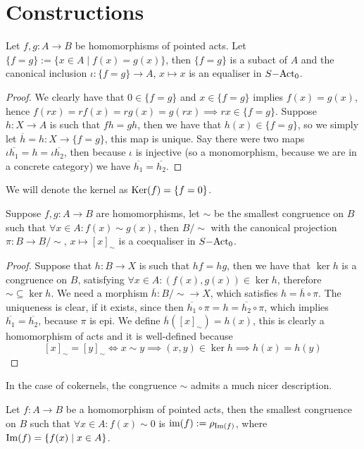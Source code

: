 \section{Constructions}
\begin{proposition}
    Let $f,g: A \to B$ be homomorphisms of pointed acts. Let $\{f=g\} := \{x\in A \mid f(x) = g(x)\}$, then $\{f=g\}$ is a subact of $A$ and 
    the canonical inclusion $\iota: \{f=g\} \to A$, $x\mapsto x$ is an equaliser in $S\mathrm{-Act}_0$.
\end{proposition}
\begin{proof}
    We clearly have that $0\in\{f=g\}$ and $x\in\{f=g\}$ implies $f(x)=g(x)$, hence $f(rx)=rf(x)=rg(x)=g(rx) \implies rx\in\{f=g\}$. 
    Suppose $h: X \to A$ is such that $fh=gh$, then we have that $h(x)\in\{f=g\}$, so we simply let $\overline{h} = h: X\to\{f=g\}$, this
    map is unique. Say there were two maps $\iota\overline{h_1}=h=\iota\overline{h_2}$, then because $\iota$ is injective (so a monomorphism, 
    because we are in a concrete category) we have $\overline{h_1}=\overline{h_2}$.
\end{proof}
    We will denote the kernel as $\mathrm{Ker}(f) = \{f=0\}$. 
\begin{proposition}
    Suppose $f,g: A\to B$ are homomorphisms, let $\sim$ be the smallest congruence on $B$ such that $\forall x\in A: f(x)\sim g(x)$, then 
    $B/\sim$ with the canonical projection $\pi: B\to B/\sim$, $x\mapsto [x]_\sim$ is a coequaliser in $S\mathrm{-Act}_0$. 
\end{proposition}
\begin{proof}
    Suppose that $h: B\to X$ is such that $hf=hg$, then we have that $\ker{h}$ is a congruence on $B$, satisfying 
    $\forall x\in A: (f(x),g(x))\in\ker{h}$, therefore $\sim\subseteq\ker{h}$. We need a morphism $\overline{h}: B/\sim \to X$, which satisfies 
    $h = \overline{h} \circ\pi$. The uniqueness is clear, if it exists, since then $\overline{h_1}\circ\pi = h = \overline{h_2}\circ\pi$, 
    which implies $\overline{h_1}=\overline{h_2}$, because $\pi$ is epi. We define $\overline{h}([x]_\sim) = h(x)$, this 
    is clearly a homomorphism of acts and it is well-defined because
    \[
        [x]_\sim = [y]_\sim\iff x\sim y \implies (x,y)\in\ker{h} \implies h(x)=h(y)
    \] 
\end{proof}
    In the case of cokernels, the congruence $\sim$ admits a much nicer description. 
\begin{proposition}
    Let $f: A \to B$ be a homomorphism of pointed acts, then the smallest congruence on $B$ such that $\forall x\in A :f(x)\sim 0$ is
    $\text{im}(f):=\rho_{\mathrm{Im}(f)}$, where $\mathrm{Im}(f) = \{f(x) \mid x\in A\}$.
\end{proposition}
